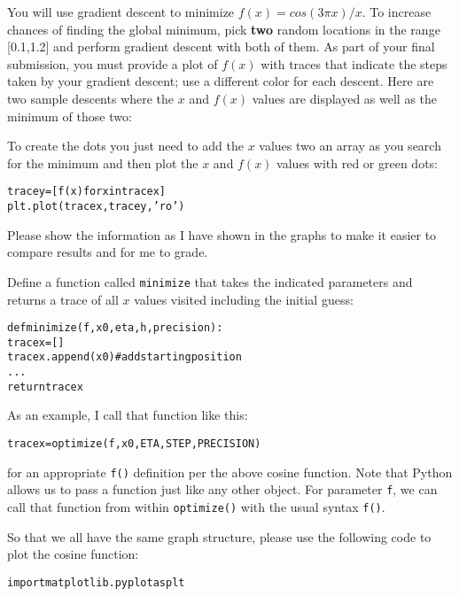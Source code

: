 \begin{fullwidth}
You will use gradient descent to minimize $f(x) = cos(3\pi x) / x$. To increase chances of finding the global minimum, pick {\bf two} random locations in the range [0.1,1.2] and perform gradient descent with both of them. As part of your final submission, you must provide a plot of $f(x)$ with traces that indicate the steps taken by your gradient descent; use a different color for each descent. Here are two sample descents where the $x$ and $f(x)$ values are displayed as well as the minimum of those two:

\noindent {}

To create the dots you just need to add the $x$ values two an array as you search for the minimum and then plot the $x$ and $f(x)$ values with red or green dots:

\begin{alltt}
tracey = [f(x) for x in tracex]
plt.plot(tracex, tracey, 'ro')
\end{alltt}

Please show the information as I have shown in the graphs to make it easier to compare results and for me to grade.

Define a function called {\tt minimize} that takes the indicated parameters and returns a trace of all $x$ values visited including the initial guess:

\begin{alltt}
def minimize(f, x0, eta, h, precision):
    tracex = []
    tracex.append(x0)  # add starting position
    ...
    return tracex
\end{alltt}

As an example, I call that function like this:

\begin{alltt}
tracex = optimize(f, x0, ETA, STEP, PRECISION)
\end{alltt}

\noindent for an appropriate {\tt f()} definition per the above cosine function.  Note that Python allows us to pass a function just like any other object.  For parameter {\tt f}, we can call that function from within {\tt optimize()} with the usual syntax {\tt f()}.

So that we all have the same graph structure, please use the following code to plot the cosine function:

\begin{alltt}
import matplotlib.pyplot as plt


\end{alltt}
\end{fullwidth}
